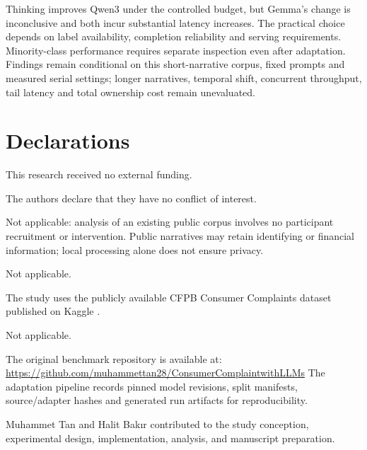 \documentclass[pdflatex,sn-mathphys-num]{sn-jnl}
\begin{document}
Thinking improves Qwen3 under the controlled budget, but Gemma's
change is inconclusive and both incur substantial latency increases.
The practical choice depends on label availability, completion
reliability and serving requirements. Minority-class performance
requires separate inspection even after adaptation. Findings remain
conditional on this short-narrative corpus, fixed prompts and measured
serial settings; longer narratives, temporal shift, concurrent throughput,
tail latency and total ownership cost remain unevaluated.

\section*{Declarations}

This research received no external funding.

The authors declare that they have no conflict of interest.

Not applicable: analysis of an existing public corpus involves no participant
recruitment or intervention. Public narratives may retain identifying or
financial information; local processing alone does not ensure privacy.

Not applicable.

The study uses the publicly available CFPB Consumer Complaints dataset
published on Kaggle \cite{tiwari2021cfpb}.

Not applicable.

The original benchmark repository is available at:
\url{https://github.com/muhammettan28/ConsumerComplaintwithLLMs}
The adaptation pipeline records pinned model revisions, split manifests,
source/adapter hashes and generated run artifacts for reproducibility.

Muhammet Tan and Halit Bak{\i}r contributed to the study conception,
experimental design, implementation, analysis, and manuscript preparation.


\end{document}

